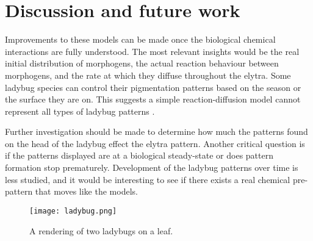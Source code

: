 \begin{table}[ht]
	\label{tab:ladyBugParameters}
\end{table}

\section{Discussion and future work}
Improvements to these models can be made once the biological chemical interactions are fully understood. The most relevant insights would be the real initial distribution of morphogens, the actual reaction behaviour between morphogens, and the rate at which they diffuse throughout the elytra. Some ladybug species can control their pigmentation patterns based on the season or the surface they are on. This suggests a simple reaction-diffusion model cannot represent all types of ladybug patterns \citep{insects2009}.

Further investigation should be made to determine how much the patterns found on the head of the ladybug effect the elytra pattern. Another critical question is if the patterns displayed are at a biological steady-state or does pattern formation stop prematurely. Development of the ladybug patterns over time is less studied, and it would be interesting to see if there exists a real chemical pre-pattern that moves like the models.


\begin{figure}[p]
	\centering
	\texttt{[image: ladybug.png]}
	\caption{A rendering of two ladybugs on a leaf.}
	\label{fig:ladybugRender}
\end{figure}
